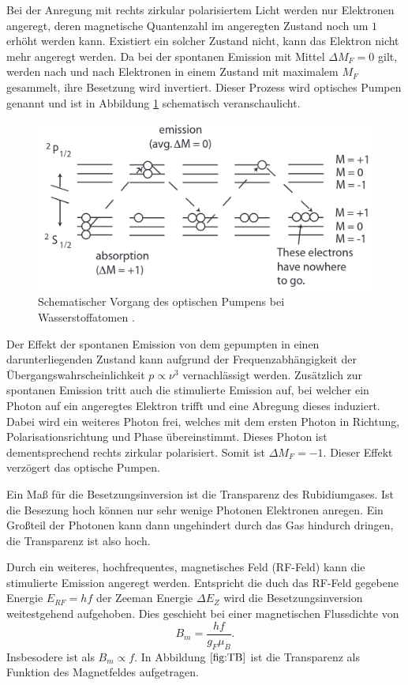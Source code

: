 \noindent
Bei der Anregung mit rechts zirkular polarisiertem Licht werden nur 
Elektronen angeregt, deren magnetische Quantenzahl im angeregten 
Zustand noch um $\num{1}$ erhöht werden kann. Existiert ein solcher
Zustand nicht, kann das Elektron nicht mehr angeregt werden. Da bei 
der spontanen Emission mit Mittel $\Delta M_F=0$ gilt, werden nach und nach 
Elektronen in einem Zustand mit maximalem $M_F$ gesammelt, ihre 
Besetzung wird invertiert. Dieser Prozess wird optisches Pumpen 
genannt und ist in Abbildung \ref{fig:pumpen} schematisch 
veranschaulicht.
\begin{figure}[H]
    \centering
    \includegraphics[scale= 0.5]{pictures/pumpen.png}
    \caption{Schematischer Vorgang des optischen Pumpens bei Wasserstoffatomen \cite{OpticalPumping}.}
    \label{fig:pumpen}
\end{figure}
\noindent
Der Effekt der spontanen Emission von dem gepumpten in einen 
darunterliegenden Zustand kann aufgrund der Frequenzabhängigkeit 
der Übergangswahrscheinlichkeit $p\propto\nu^3$ vernachlässigt werden.
Zusätzlich zur spontanen Emission tritt auch die stimulierte Emission
auf, bei welcher ein Photon auf ein angeregtes Elektron trifft und
eine Abregung dieses induziert. Dabei wird ein weiteres Photon 
frei, welches mit dem ersten Photon in Richtung, Polarisationsrichtung
und Phase übereinstimmt. Dieses Photon ist dementsprechend rechts zirkular
polarisiert. Somit ist $\Delta M_F=-1$. Dieser Effekt verzögert das 
optische Pumpen.

\noindent
Ein Maß für die Besetzungsinversion ist die Transparenz des 
Rubidiumgases. Ist die Besezung hoch können nur sehr wenige Photonen
Elektronen anregen. Ein Großteil der Photonen kann dann ungehindert
durch das Gas hindurch dringen, die Transparenz ist also hoch. 

\noindent
Durch ein weiteres, hochfrequentes, magnetisches Feld (RF-Feld) kann
die stimulierte Emission angeregt werden. Entspricht die duch das
RF-Feld gegebene Energie $E_{RF}=hf$ der Zeeman Energie $\Delta E_Z$
wird die Besetzungsinversion weitestgehend aufgehoben. Dies geschieht
bei einer magnetischen Flussdichte von
\begin{equation}
    B_m=\frac{hf}{g_F\mu_B} .
    \label{eqn:bf}
\end{equation}
Insbesodere ist als $B_m\propto f$. In Abbildung $\ref{fig:TB}$ ist 
die Transparenz als Funktion des Magnetfeldes aufgetragen.

